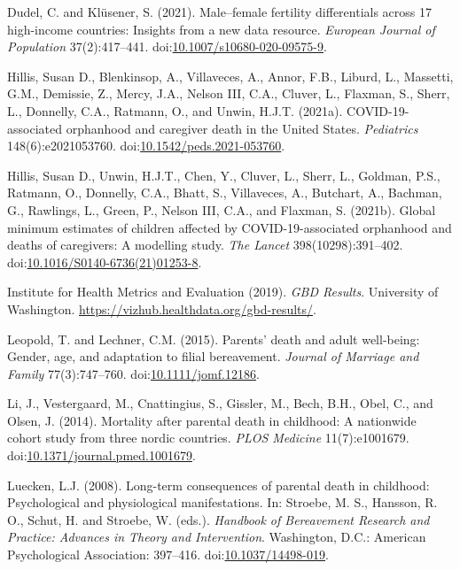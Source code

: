 \documentclass[
  11pt,
  letterpaper,
]{article}
\newlength{\cslhangindent}
\newlength{\cslentryspacingunit} %
\newenvironment{CSLReferences}[2] %
 {%
  \setlength{\parindent}{0pt}
  \ifodd #1
  \let\oldpar\par
  \def\par{\hangindent=\cslhangindent\oldpar}
  \fi
  \setlength{\parskip}{#2\cslentryspacingunit}
 }%
 {}
\begin{document}
\begin{CSLReferences}{1}{0}
\leavevmode{}%
Dudel, C. and Klüsener, S. (2021). Male--female fertility differentials across 17 high-income countries: Insights from a new data resource. \emph{European Journal of Population} 37(2):417--441. doi:\href{https://doi.org/10.1007/s10680-020-09575-9}{10.1007/s10680-020-09575-9}.

\leavevmode{}%
Hillis, Susan D., Blenkinsop, A., Villaveces, A., Annor, F.B., Liburd, L., Massetti, G.M., Demissie, Z., Mercy, J.A., Nelson III, C.A., Cluver, L., Flaxman, S., Sherr, L., Donnelly, C.A., Ratmann, O., and Unwin, H.J.T. (2021a). COVID-19-associated orphanhood and caregiver death in the {U}nited {S}tates. \emph{Pediatrics} 148(6):e2021053760. doi:\href{https://doi.org/10.1542/peds.2021-053760}{10.1542/peds.2021-053760}.

\leavevmode{}%
Hillis, Susan D., Unwin, H.J.T., Chen, Y., Cluver, L., Sherr, L., Goldman, P.S., Ratmann, O., Donnelly, C.A., Bhatt, S., Villaveces, A., Butchart, A., Bachman, G., Rawlings, L., Green, P., Nelson III, C.A., and Flaxman, S. (2021b). Global minimum estimates of children affected by COVID-19-associated orphanhood and deaths of caregivers: A modelling study. \emph{The Lancet} 398(10298):391--402. doi:\href{https://doi.org/10.1016/S0140-6736(21)01253-8}{10.1016/S0140-6736(21)01253-8}.

\leavevmode{}%
Institute for Health Metrics and Evaluation (2019). \emph{GBD Results}. University of Washington. \url{https://vizhub.healthdata.org/gbd-results/}.

\leavevmode{}%
Leopold, T. and Lechner, C.M. (2015). Parents' death and adult well-being: Gender, age, and adaptation to filial bereavement. \emph{Journal of Marriage and Family} 77(3):747--760. doi:\href{https://doi.org/10.1111/jomf.12186}{10.1111/jomf.12186}.

\leavevmode{}%
Li, J., Vestergaard, M., Cnattingius, S., Gissler, M., Bech, B.H., Obel, C., and Olsen, J. (2014). Mortality after parental death in childhood: A nationwide cohort study from three nordic countries. \emph{PLOS Medicine} 11(7):e1001679. doi:\href{https://doi.org/10.1371/journal.pmed.1001679}{10.1371/journal.pmed.1001679}.

\leavevmode{}%
Luecken, L.J. (2008). Long-term consequences of parental death in childhood: Psychological and physiological manifestations. In: Stroebe, M. S., Hansson, R. O., Schut, H. and Stroebe, W. (eds.). \emph{Handbook of Bereavement Research and Practice: Advances in Theory and Intervention}. Washington, D.C.: American Psychological Association: 397--416. doi:\href{https://doi.org/10.1037/14498-019}{10.1037/14498-019}.


\end{CSLReferences}
\end{document}
